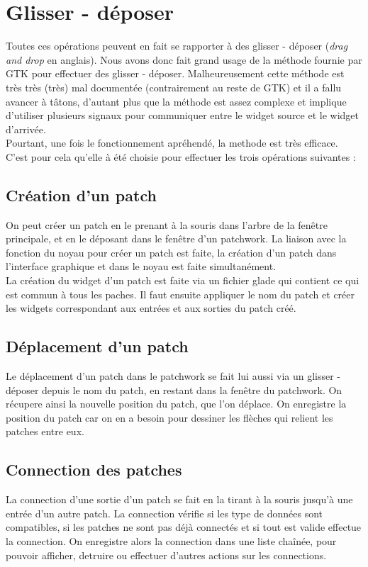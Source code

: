 \section{Glisser - d\'eposer}

Toutes ces op\'erations peuvent en fait se rapporter \`a des
glisser - d\'eposer ({\em drag and drop} en anglais). Nous avons donc
fait grand usage de la m\'ethode fournie par GTK pour effectuer des
glisser - d\'eposer. Malheureusement cette m\'ethode est tr\`es tr\`es
(tr\`es) mal document\'ee (contrairement au reste de GTK) et il a fallu
avancer \`a t\^atons, d'autant plus que la m\'ethode est assez complexe
et implique d'utiliser plusieurs signaux pour communiquer entre le widget
source et le widget d'arriv\'ee.\\

Pourtant, une fois le fonctionnement apr\'ehend\'e, la methode est
tr\`es efficace. C'est pour cela qu'elle \`a \'et\'e choisie pour
effectuer les trois op\'erations suivantes :\\


\subsection{Cr\'eation d'un patch}
On peut cr\'eer un patch en le prenant \`a la souris dans l'arbre
de la fen\^etre principale, et en le d\'eposant dans le fen\^etre
d'un patchwork. La liaison avec la fonction du noyau pour cr\'eer
un patch est faite, la cr\'eation d'un patch dans l'interface graphique
et dans le noyau est faite simultan\'ement.\\

La cr\'eation du widget d'un patch est faite via un fichier glade
qui contient ce qui est commun \`a tous les paches. Il faut ensuite
appliquer le nom du patch et cr\'eer les widgets correspondant aux
entr\'ees et aux sorties du patch cr\'e\'e.\\

\newpage

\subsection{D\'eplacement d'un patch}
Le d\'eplacement d'un patch dans le patchwork se fait lui aussi via un
glisser - d\'eposer depuis le nom du patch, en restant dans la fen\^etre
du patchwork. On r\'ecupere ainsi la nouvelle position du patch,
que l'on d\'eplace. On enregistre la position du patch car on en a besoin
pour dessiner les fl\`eches qui relient les patches entre eux.\\

\subsection{Connection des patches}
La connection d'une sortie d'un patch se fait en la tirant \`a la souris
jusqu'\`a une entr\'ee d'un autre patch. La connection v\'erifie
si les type de donn\'ees sont compatibles, si les patches ne sont pas
d\'ej\`a connect\'es et si tout est valide effectue la connection.
On enregistre alors la connection dans une liste cha\^in\'ee, pour
pouvoir afficher, detruire ou effectuer d'autres actions
sur les connections.\\
